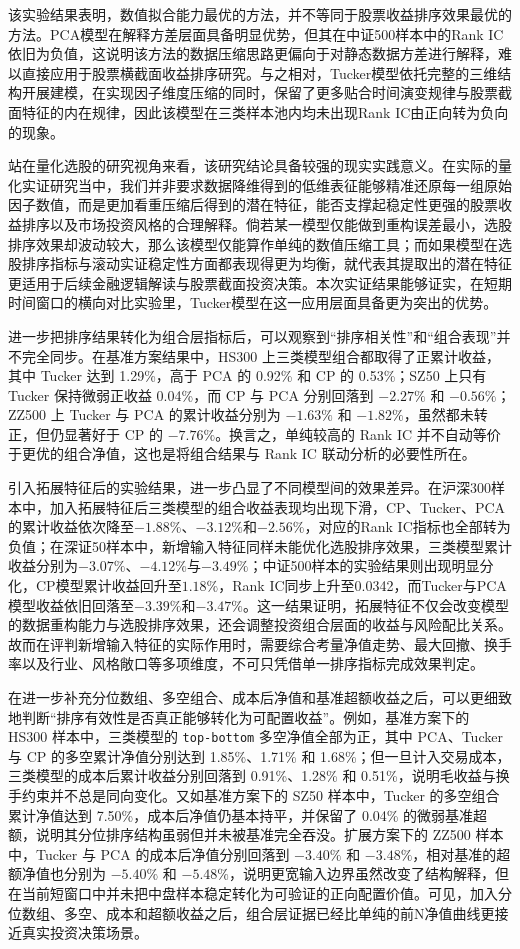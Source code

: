 该实验结果表明，数值拟合能力最优的方法，并不等同于股票收益排序效果最优的方法。PCA模型在解释方差层面具备明显优势，但其在中证500样本中的Rank IC依旧为负值，这说明该方法的数据压缩思路更偏向于对静态数据方差进行解释，难以直接应用于股票横截面收益排序研究。与之相对，Tucker模型依托完整的三维结构开展建模，在实现因子维度压缩的同时，保留了更多贴合时间演变规律与股票截面特征的内在规律，因此该模型在三类样本池内均未出现Rank IC由正向转为负向的现象。

站在量化选股的研究视角来看，该研究结论具备较强的现实实践意义。在实际的量化实证研究当中，我们并非要求数据降维得到的低维表征能够精准还原每一组原始因子数值，而是更加看重压缩后得到的潜在特征，能否支撑起稳定性更强的股票收益排序以及市场投资风格的合理解释。倘若某一模型仅能做到重构误差最小，选股排序效果却波动较大，那么该模型仅能算作单纯的数值压缩工具；而如果模型在选股排序指标与滚动实证稳定性方面都表现得更为均衡，就代表其提取出的潜在特征更适用于后续金融逻辑解读与股票截面投资决策。本次实证结果能够证实，在短期时间窗口的横向对比实验里，Tucker模型在这一应用层面具备更为突出的优势。

进一步把排序结果转化为组合层指标后，可以观察到“排序相关性”和“组合表现”并不完全同步。在基准方案结果中，HS300 上三类模型组合都取得了正累计收益，其中 Tucker 达到 1.29\%，高于 PCA 的 0.92\% 和 CP 的 0.53\%；SZ50 上只有 Tucker 保持微弱正收益 0.04\%，而 CP 与 PCA 分别回落到 $-2.27\%$ 和 $-0.56\%$；ZZ500 上 Tucker 与 PCA 的累计收益分别为 $-1.63\%$ 和 $-1.82\%$，虽然都未转正，但仍显著好于 CP 的 $-7.76\%$。换言之，单纯较高的 Rank IC 并不自动等价于更优的组合净值，这也是将组合结果与 Rank IC 联动分析的必要性所在。

引入拓展特征后的实验结果，进一步凸显了不同模型间的效果差异。在沪深300样本中，加入拓展特征后三类模型的组合收益表现均出现下滑，CP、Tucker、PCA的累计收益依次降至$-1.88\%$、$-3.12\%$和$-2.56\%$，对应的Rank IC指标也全部转为负值；在深证50样本中，新增输入特征同样未能优化选股排序效果，三类模型累计收益分别为$-3.07\%$、$-4.12\%$与$-3.49\%$；中证500样本的实验结果则出现明显分化，CP模型累计收益回升至$1.18\%$，Rank IC同步上升至0.0342，而Tucker与PCA模型收益依旧回落至$-3.39\%$和$-3.47\%$。这一结果证明，拓展特征不仅会改变模型的数据重构能力与选股排序效果，还会调整投资组合层面的收益与风险配比关系。故而在评判新增输入特征的实际作用时，需要综合考量净值走势、最大回撤、换手率以及行业、风格敞口等多项维度，不可只凭借单一排序指标完成效果判定。

在进一步补充分位数组、多空组合、成本后净值和基准超额收益之后，可以更细致地判断“排序有效性是否真正能够转化为可配置收益”。例如，基准方案下的 HS300 样本中，三类模型的 \texttt{top-bottom} 多空净值全部为正，其中 PCA、Tucker 与 CP 的多空累计净值分别达到 1.85\%、1.71\% 和 1.68\%；但一旦计入交易成本，三类模型的成本后累计收益分别回落到 0.91\%、1.28\% 和 0.51\%，说明毛收益与换手约束并不总是同向变化。又如基准方案下的 SZ50 样本中，Tucker 的多空组合累计净值达到 7.50\%，成本后净值仍基本持平，并保留了 0.04\% 的微弱基准超额，说明其分位排序结构虽弱但并未被基准完全吞没。扩展方案下的 ZZ500 样本中，Tucker 与 PCA 的成本后净值分别回落到 $-3.40\%$ 和 $-3.48\%$，相对基准的超额净值也分别为 $-5.40\%$ 和 $-5.48\%$，说明更宽输入边界虽然改变了结构解释，但在当前短窗口中并未把中盘样本稳定转化为可验证的正向配置价值。可见，加入分位数组、多空、成本和超额收益之后，组合层证据已经比单纯的前N净值曲线更接近真实投资决策场景。

